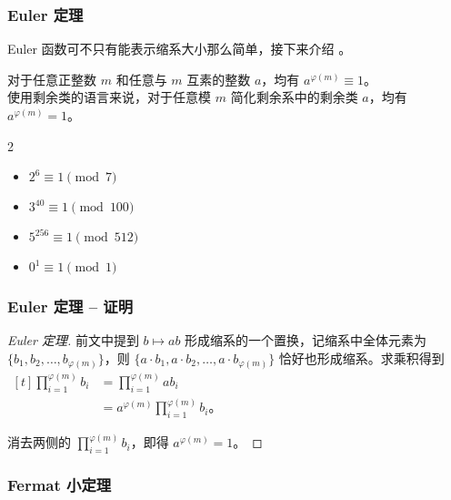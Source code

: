 \documentclass{../pkslide}
\begin{document}
\begin{frame}
  \frametitle{Euler 定理}
  Euler 函数可不只有能表示缩系大小那么简单，接下来介绍 。
  
  \pause
  \begin{theorem}[Euler 定理]
    对于任意正整数 $m$ 和任意与 $m$ \alert{互素}的整数 $a$，均有 $a^{\varphi(m)} \equiv 1$。\\
    使用剩余类的语言来说，对于任意模 $m$ \alert{简化剩余系}中的剩余类 $a$，均有 $a^{\varphi(m)} = 1$。
  \end{theorem}
  
  \pause
  \begin{example}[Euler 定理]
    \begin{mymulticols}[l][l]{2}
      \begin{itemize}
        \item $2^6 \equiv 1 \pmod{7}$
        \item $3^{40} \equiv 1 \pmod{100}$
        \item $5^{256} \equiv 1 \pmod{512}$
        \item $0^1 \equiv 1 \pmod{1}$
      \end{itemize}
    \end{mymulticols}
  \end{example}
\end{frame}

\begin{frame}
  \frametitle{Euler 定理 -- 证明}
  \begin{proof}[Euler 定理]
    前文中提到 $b \mapsto a b$ 形成缩系的一个置换，记缩系中全体元素为 $\{ b_1, b_2, \ldots, b_{\varphi(m)} \}$，则 $\{ a \cdot b_1, a \cdot b_2, \ldots, a \cdot b_{\varphi(m)} \}$ 恰好也形成缩系。求乘积得到 $\begin{aligned}[t] \textstyle \prod_{i = 1}^{\varphi(m)} b_i &= \textstyle \prod_{i = 1}^{\varphi(m)} a b_i \\ &= \textstyle a^{\varphi(m)} \prod_{i = 1}^{\varphi(m)} b_i \text{。} \end{aligned}$
    
    消去两侧的 $\prod_{i = 1}^{\varphi(m)} b_i$，即得 $a^{\varphi(m)} = 1$。
  \end{proof}
\end{frame}

\subsubsection{Fermat 小定理}
\end{document}
